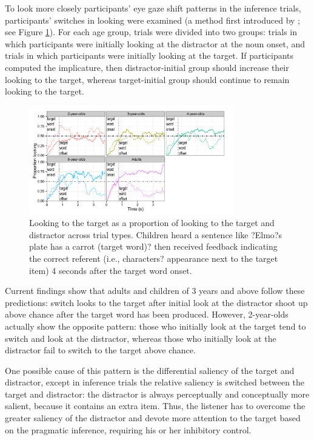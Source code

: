 \documentclass[10pt,letterpaper]{article}
\begin{document}
To look more closely participants' eye gaze shift patterns in the inference trials, participants' switches in looking were examined (a method first introduced by ; see Figure \ref{fig:onset}).  For each age group, trials were divided into two groups: trials in which participants were initially looking at the distractor at the noun onset, and trials in which participants were initially looking at the target.  If participants computed the implicature, then distractor-initial group should increase their looking to the target, whereas target-initial group should continue to remain looking to the target. 

\begin{figure}
\begin{center} 
\includegraphics[width=3.5in]{figures/140521-simpimp_age_targAtOnset-edit.pdf}
\caption{\label{fig:onset} Looking to the target as a proportion of looking to the target and distractor across trial types. Children heard a sentence like ?Elmo?s plate has a carrot (target word)? then received feedback indicating the correct referent (i.e., characters? appearance next to the target item) 4 seconds after the target word onset.}
\end{center} 
\end{figure}

Current findings show that adults and children of 3 years and above follow these predictions: switch looks to the target after initial look at the distractor shoot up above chance after the target word has been produced. However, 2-year-olds actually show the opposite pattern: those who initially look at the target tend to switch and look at the distractor, whereas those who initially look at the distractor fail to switch to the target above chance. 

One possible cause of this pattern is the differential saliency of the target and distractor, except in inference trials the relative saliency is switched between the target and distractor: the distractor is always perceptually and conceptually more salient, because it contains an extra item. Thus, the listener has to overcome the greater saliency of the distractor and devote more attention to the target based on the pragmatic inference, requiring his or her inhibitory control. 
\end{document}
